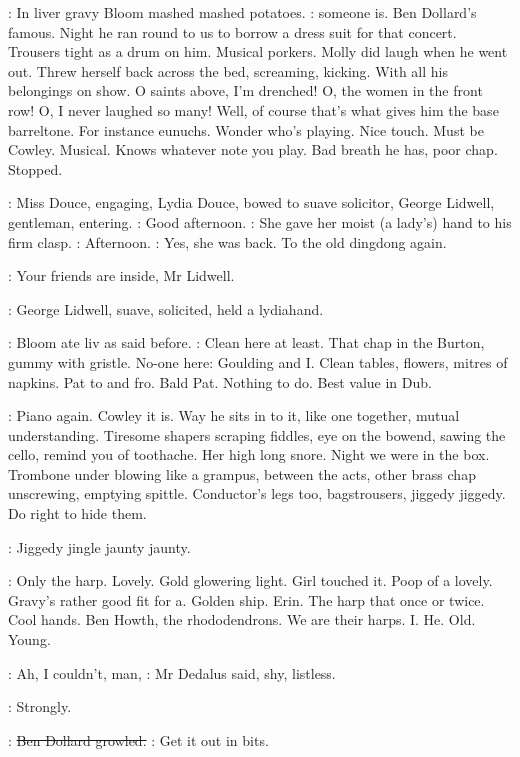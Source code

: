 :
In liver gravy Bloom mashed mashed potatoes.
\BloomInt:
someone is. Ben Dollard's famous. Night he ran round to us to borrow a
dress suit for that concert. Trousers tight as a drum on him. Musical
porkers. Molly did laugh when he went out. Threw herself back across the
bed, screaming, kicking. With all his belongings on show. O saints above,
I'm drenched! O, the women in the front row! O, I never laughed so many!
Well, of course that's what gives him the base barreltone. For instance
eunuchs.
Wonder who's playing. Nice touch. Must be Cowley. Musical.
Knows whatever note you play. Bad breath he has, poor chap. Stopped.

:
Miss Douce, engaging, Lydia Douce, bowed to suave solicitor, George
Lidwell, gentleman, entering.
\lidwell:
Good afternoon.
:
She gave her moist (a lady's) hand to his firm clasp.
\MissD:
Afternoon.
:
Yes, she was back. To the old dingdong again.

\MissD:
Your friends are inside, Mr Lidwell.

:
George Lidwell, suave, solicited, held a lydiahand.

:
Bloom ate liv as said before.
\BloomInt:
Clean here at least. That chap in the
Burton, gummy with gristle.
No-one here: Goulding and I. Clean tables,
flowers, mitres of napkins. Pat to and fro. Bald Pat. Nothing to do. Best
value in Dub.

\BloomInt:
Piano again. Cowley it is. Way he sits in to it, like one together,
mutual understanding. Tiresome shapers scraping fiddles, eye on the
bowend, sawing the cello, remind you of toothache. Her high long snore.
Night we were in the box. Trombone under blowing like a grampus,
between the acts, other brass chap unscrewing, emptying spittle.
Conductor's legs too, bagstrousers, jiggedy jiggedy. Do right to hide
them.

:
Jiggedy jingle jaunty jaunty.

\BloomInt:
Only the harp. Lovely. Gold glowering light. Girl touched it.
Poop of
a lovely. Gravy's rather good fit for a. Golden ship. Erin. The harp that
once or twice. Cool hands. Ben Howth, the rhododendrons. We are their
harps. I. He. Old. Young.

\simon:
Ah, I couldn't, man,
:
Mr Dedalus said, shy, listless.

:
Strongly.

\dollard:
\sout{Ben Dollard growled.}
\dollard:
Get it out in bits.

